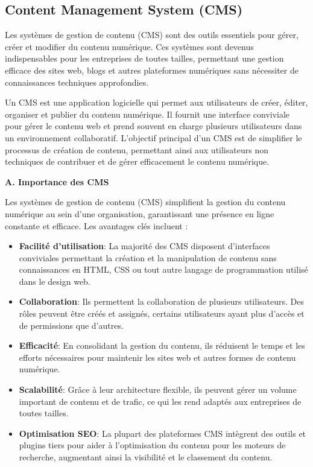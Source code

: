 \subsection{Content Management System (CMS)}


\hspace{\parindent}Les systèmes de gestion de contenu (CMS) sont des outils essentiels pour gérer, créer et modifier du contenu numérique. Ces systèmes sont devenus indispensables pour les entreprises de toutes tailles, permettant une gestion efficace des sites web, blogs et autres plateformes numériques sans nécessiter de connaissances techniques approfondies.

Un CMS est une application logicielle qui permet aux utilisateurs de créer, éditer, organiser et publier du contenu numérique. Il fournit une interface conviviale pour gérer le contenu web et prend souvent en charge plusieurs utilisateurs dans un environnement collaboratif. L'objectif principal d'un CMS est de simplifier le processus de création de contenu, permettant ainsi aux utilisateurs non techniques de contribuer et de gérer efficacement le contenu numérique.

\textbf{A. Importance des CMS}

Les systèmes de gestion de contenu (CMS) simplifient la gestion du contenu numérique au sein d'une organisation, garantissant une présence en ligne constante et efficace. Les avantages clés incluent :

\begin{itemize}
    \item \textbf{Facilité d'utilisation}: La majorité des CMS disposent d'interfaces conviviales permettant la création et la manipulation de contenu sans connaissances en HTML, CSS ou tout autre langage de programmation utilisé dans le design web.

    \item \textbf{Collaboration}: Ils permettent la collaboration de plusieurs utilisateurs. Des rôles peuvent être créés et assignés, certains utilisateurs ayant plus d'accès et de permissions que d'autres.


    \item \textbf{Efficacité}: En consolidant la gestion du contenu, ils réduisent le temps et les efforts nécessaires pour maintenir les sites web et autres formes de contenu numérique.

    \item \textbf{Scalabilité}: Grâce à leur architecture flexible, ils peuvent gérer un volume important de contenu et de trafic, ce qui les rend adaptés aux entreprises de toutes tailles.

    \item \textbf{Optimisation SEO}: La plupart des plateformes CMS intègrent des outils et plugins tiers pour aider à l'optimisation du contenu pour les moteurs de recherche, augmentant ainsi la visibilité et le classement du contenu.
\end{itemize}

